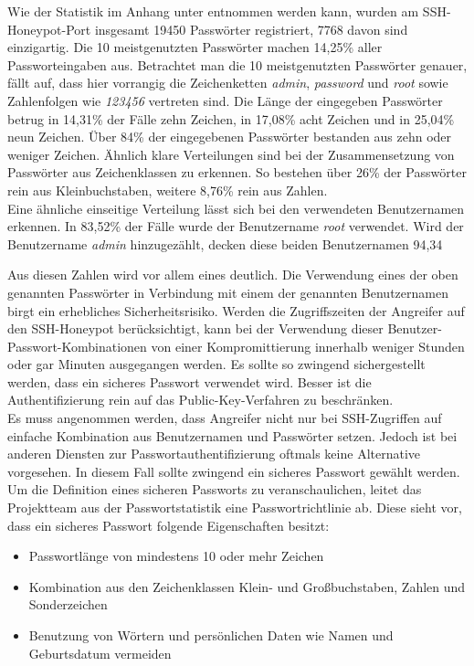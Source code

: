 Wie der Statistik im Anhang unter  entnommen werden kann, wurden am SSH-Honeypot-Port insgesamt 19450 Passwörter registriert, 7768 davon sind einzigartig. Die 10 meistgenutzten Passwörter machen 14,25\% aller Passworteingaben aus. Betrachtet man die 10 meistgenutzten Passwörter genauer, fällt auf, dass hier vorrangig die Zeichenketten \textit{admin}, \textit{password} und \textit{root} sowie Zahlenfolgen wie \textit{123456} vertreten sind. Die Länge der eingegeben Passwörter betrug in 14,31\% der Fälle zehn Zeichen, in 17,08\% acht Zeichen und in 25,04\% neun Zeichen. Über 84\% der eingegebenen Passwörter bestanden aus zehn oder weniger Zeichen. Ähnlich klare Verteilungen sind bei der Zusammensetzung von Passwörter aus Zeichenklassen zu erkennen. So bestehen über 26\% der Passwörter rein aus Kleinbuchstaben, weitere 8,76\% rein aus Zahlen.\\

Eine ähnliche einseitige Verteilung lässt sich bei den verwendeten Benutzernamen erkennen. In 83,52\% der Fälle wurde der Benutzername \textit{root} verwendet. Wird der Benutzername \textit{admin} hinzugezählt, decken diese beiden Benutzernamen 94,34%

Aus diesen Zahlen wird vor allem eines deutlich. Die Verwendung eines der oben genannten Passwörter in Verbindung mit einem der genannten Benutzernamen birgt ein erhebliches Sicherheitsrisiko. Werden die Zugriffszeiten der Angreifer auf den SSH-Honeypot berücksichtigt, kann bei der Verwendung dieser Benutzer-Passwort-Kombinationen von einer Kompromittierung innerhalb weniger Stunden oder gar Minuten ausgegangen werden. Es sollte so zwingend sichergestellt werden, dass ein sicheres Passwort verwendet wird. Besser ist die Authentifizierung rein auf das Public-Key-Verfahren zu beschränken.\\

Es muss angenommen werden, dass Angreifer nicht nur bei SSH-Zugriffen auf einfache Kombination aus Benutzernamen und Passwörter setzen. Jedoch ist bei anderen Diensten zur Passwortauthentifizierung oftmals keine Alternative vorgesehen. In diesem Fall sollte zwingend ein sicheres Passwort gewählt werden. Um die Definition eines sicheren Passworts zu veranschaulichen, leitet das Projektteam aus der Passwortstatistik eine Passwortrichtlinie ab. Diese sieht vor, dass ein sicheres Passwort folgende Eigenschaften besitzt:

\begin{itemize}
\item Passwortlänge von mindestens 10 oder mehr Zeichen
\item Kombination aus den Zeichenklassen Klein- und Großbuchstaben, Zahlen und Sonderzeichen
\item Benutzung von Wörtern und persönlichen Daten wie Namen und Geburtsdatum vermeiden
\end{itemize}


